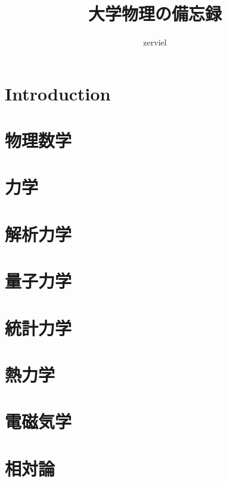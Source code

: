 \documentclass[dvipdfmx,a4j,12pt]{jsarticle}
\title{大学物理の備忘録}
\author{zerviel}
\begin{document}
\maketitle

\part*{Introduction}
        
\part{物理数学}
    
\part{力学}
    
\part{解析力学}
    
\part{量子力学}
    
\part{統計力学}
    
\part{熱力学}

\part{電磁気学}

\part{相対論}
\end{document}
